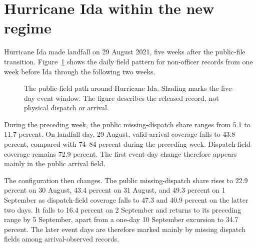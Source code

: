 \documentclass[11pt]{article}
\begin{document}
\section{Hurricane Ida within the new regime}

Hurricane Ida made landfall on 29 August 2021, five weeks after the public-file transition. Figure~\ref{fig:idapath} shows the daily field pattern for non-officer records from one week before Ida through the following two weeks.

\begin{figure}[!htbp]
\centering
{}
\caption{The public-field path around Hurricane Ida. Shading marks the five-day event window. The figure describes the released record, not physical dispatch or arrival.}
\label{fig:idapath}
\end{figure}

During the preceding week, the public missing-dispatch share ranges from 5.1 to 11.7 percent. On landfall day, 29 August, valid-arrival coverage falls to 43.8 percent, compared with 74--84 percent during the preceding week. Dispatch-field coverage remains 72.9 percent. The first event-day change therefore appears mainly in the public arrival field.

The configuration then changes. The public missing-dispatch share rises to 22.9 percent on 30 August, 43.4 percent on 31 August, and 49.3 percent on 1 September as dispatch-field coverage falls to 47.3 and 40.9 percent on the latter two days. It falls to 16.4 percent on 2 September and returns to its preceding range by 5 September, apart from a one-day 10 September excursion to 34.7 percent. The later event days are therefore marked mainly by missing dispatch fields among arrival-observed records.
\end{document}
